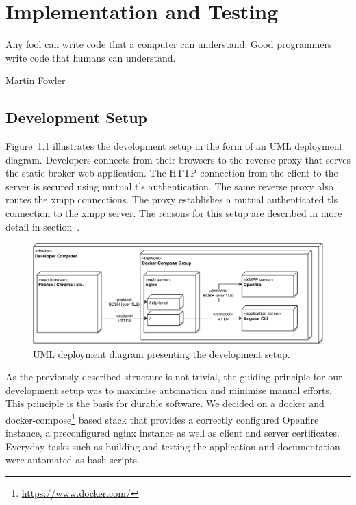 \chapter{Implementation and Testing} %
\epigraph{Any fool can write code that a computer can understand. Good programmers write code that humans can understand.}{Martin Fowler}


\section{Development Setup}\label{sec:development-setup}

Figure~\ref{fig:development-setup} illustrates the development setup in the form of an UML deployment diagram.
Developers connects from their browsers to the reverse proxy that serves the static \gls{broker} web application.
The HTTP connection from the client to the server is secured using mutual \gls{tls} authentication.
The same reverse proxy also routes the \gls{xmpp} connections.
The proxy establishes a mutual authenticated \gls{tls} connection to the \gls{xmpp} server.
The reasons for this setup are described in more detail in section~.

\begin{figure}[h]
    \centering
    \includegraphics[width=1\linewidth]{resources/development-setup-uml}
    \caption[Development setup deployment diagram]{UML deployment diagram presenting the development setup.}
    \label{fig:development-setup}
\end{figure}

As the previously described structure is not trivial, the guiding principle for our development setup was to maximise automation and minimise manual efforts.
This principle is the basis for durable software.
We decided on a docker and docker-compose\footnote{\url{https://www.docker.com/}} based stack that provides a correctly configured Openfire instance, a preconfigured nginx instance as well as client and server certificates.
Everyday tasks such as building and testing the application and documentation were automated as bash scripts.

